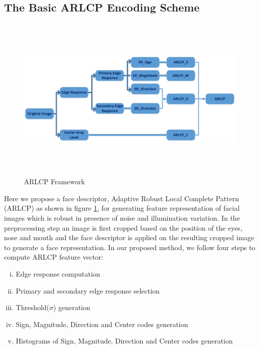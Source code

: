 \documentclass[12pt]{article}
\begin{document}
\subsection{The Basic ARLCP Encoding Scheme}
\begin{figure}[H]
	\begin{center}
		\includegraphics[width=12cm,height=8cm,keepaspectratio]{ARLCP_Framework.png}
		\caption{ARLCP Framework}
				\label{fig:ARLCP_Framework}
	\end{center}
\end{figure}
Here we propose a face descriptor, Adaptive Robust Local Complete Pattern (ARLCP) as shown in figure \ref{fig:ARLCP_Framework}, for generating feature representation of facial images which is robust in presence of noise and illumination variation. In the preprocessing step an image is first cropped based on the position of the eyes, nose and mouth and the face descriptor is applied on the resulting cropped image to generate a face representation. In our proposed method, we follow four steps to compute ARLCP feature vector:
\begin{enumerate}[i.]
	\item Edge response computation
	\item Primary and secondary edge response selection
	\item Threshold($\sigma$) generation
	\item Sign, Magnitude, Direction and Center codes generation
	\item Histograms of Sign, Magnitude, Direction and Center codes generation 
\end{enumerate}
\end{document}
